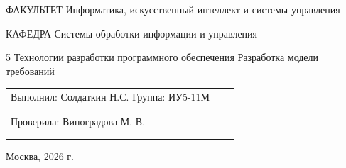 \newcommand{\baumanAuthors}[3]{%
	\par
	\noindent
	\begingroup
	\setlength{\parindent}{0pt}%
	\setlength{\leftskip}{0pt}%
	\baumanfont
	\mdseries
	\fontsize{12}{14}\selectfont

	\setlength{\tabcolsep}{3pt}%

	\begin{tabularx}{\dimexpr\linewidth-20mm\relax}{%
		@{}
		>{\raggedright\arraybackslash}X
		>{\centering\arraybackslash}p{18mm}
		>{\centering\arraybackslash}p{18mm}
		@{}
		}
		Выполнил: #2\newline
		Группа: #1
		 &
		\shortstack[c]{%
		\rule{16mm}{0.4pt} \\[-1mm]
		{\fontsize{9}{11}\selectfont (подпись)}
		}
		 &
		\shortstack[c]{%
		\rule{16mm}{0.4pt} \\[-1mm]
		{\fontsize{9}{11}\selectfont (дата)}
		}
		\\[10mm]

		Проверила: #3
		 &
		\shortstack[c]{%
		\rule{16mm}{0.4pt} \\[-1mm]
		{\fontsize{9}{11}\selectfont (подпись)}
		}
		 &
		\shortstack[c]{%
		\rule{16mm}{0.4pt} \\[-1mm]
		{\fontsize{9}{11}\selectfont (дата)}
		}
	\end{tabularx}

	\endgroup
	\par
}

\newcommand{\baumanPlace}[2]{%
	\par
	\begingroup
	\centering
	\baumanfont
	\mdseries
	\fontsize{12}{14}\selectfont
	#1, #2 г.%
	\par
	\endgroup
}

\begin{titlepage}
	\thispagestyle{empty}
	\baumanUniversityHeader

	\baumanInfoRow
	{ФАКУЛЬТЕТ}
	{Информатика, искусственный интеллект и системы управления}

	\vspace{4mm}

	\baumanInfoRow
	{КАФЕДРА}
	{Системы обработки информации и управления}

	\vfill

	\baumanLabTitle
	{5}
	{Технологии разработки программного обеспечения}
	{Разработка модели требований}

	\vfill

	\baumanAuthors
	{ИУ5-11М}
	{Солдаткин Н.С.}
	{Виноградова М. В.}

	\vfill

	\baumanPlace{Москва}{2026}
\end{titlepage}

